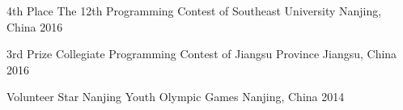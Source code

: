 
\begin{cvhonors}


  \cvhonor
    {4th Place} %
    {The 12th Programming Contest of Southeast University} %
    {Nanjing, China} %
    {2016} %

  \cvhonor
    {3rd Prize} %
    {Collegiate Programming Contest of Jiangsu Province} %
    {Jiangsu, China} %
    {2016} %




  \cvhonor
    {Volunteer Star} %
    {Nanjing Youth Olympic Games} %
    {Nanjing, China} %
    {2014} %
                















\end{cvhonors}
